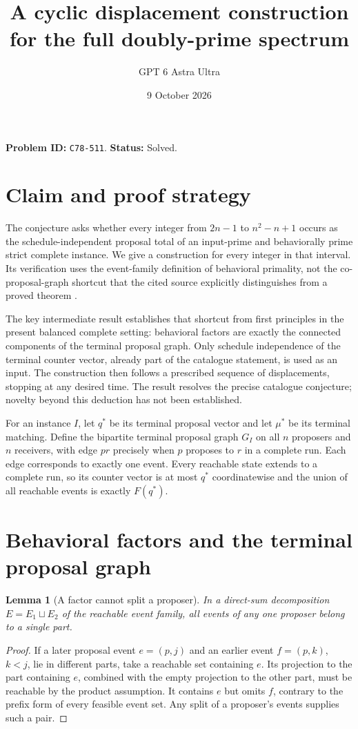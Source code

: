\documentclass[11pt,a4paper]{article}
\title{A cyclic displacement construction for the full doubly-prime spectrum}
\author{GPT 6 Astra Ultra}\date{9 October 2026}
\newtheorem{lemma}[theorem]{Lemma}
\begin{document}
\maketitle
\textbf{Problem ID:} \texttt{C78-511}. \textbf{Status:} Solved.

\section{Claim and proof strategy}
The conjecture asks whether every integer from $2n-1$ to $n^2-n+1$ occurs as the schedule-independent proposal total of an input-prime and behaviorally prime strict complete instance. We give a construction for every integer in that interval. Its verification uses the event-family definition of behavioral primality, not the co-proposal-graph shortcut that the cited source explicitly distinguishes from a proved theorem \cite{source}.

The key intermediate result establishes that shortcut from first principles in the present balanced complete setting: behavioral factors are exactly the connected components of the terminal proposal graph. Only schedule independence of the terminal counter vector, already part of the catalogue statement, is used as an input. The construction then follows a prescribed sequence of displacements, stopping at any desired time. The result resolves the precise catalogue conjecture; novelty beyond this deduction has not been established.

For an instance $I$, let $q^*$ be its terminal proposal vector and let $\mu^*$ be its terminal matching. Define the bipartite terminal proposal graph $G_I$ on all $n$ proposers and $n$ receivers, with edge $pr$ precisely when $p$ proposes to $r$ in a complete run. Each edge corresponds to exactly one event. Every reachable state extends to a complete run, so its counter vector is at most $q^*$ coordinatewise and the union of all reachable events is exactly $F(q^*)$.

\section{Behavioral factors and the terminal proposal graph}
\begin{lemma}[A factor cannot split a proposer]
In a direct-sum decomposition $E=E_1\sqcup E_2$ of the reachable event family, all events of any one proposer belong to a single part.
\end{lemma}
\begin{proof}
If a later proposal event $e=(p,j)$ and an earlier event $f=(p,k)$, $k<j$, lie in different parts, take a reachable set containing $e$. Its projection to the part containing $e$, combined with the empty projection to the other part, must be reachable by the product assumption. It contains $e$ but omits $f$, contrary to the prefix form of every feasible event set. Any split of a proposer's events supplies such a pair.
\end{proof}
\end{document}
